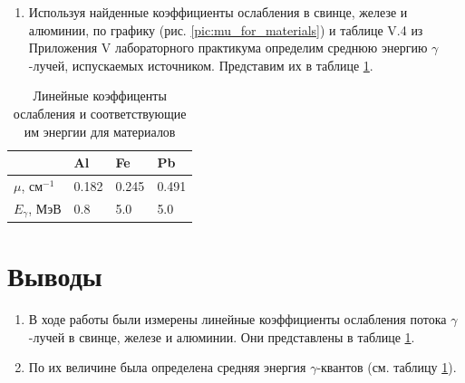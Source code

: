 \documentclass[a4paper,12pt]{article}
\begin{document}
\begin{enumerate}[resume]
    \item Используя найденные коэффициенты ослабления в свинце, железе и алюминии, по графику (рис. \ref{pic:mu_for_materials}) и таблице V.4 из Приложения V лабораторного практикума определим среднюю энергию $\gamma$-лучей, испускаемых источником. Представим их в таблице \ref{table:8}.
\end{enumerate}


\FloatBarrier
\begin{table}[!ht]
    \centering
    \begin{tabular}{|l|l|l|l|}
        \hline
        ~ & Al & Fe & Pb \\ \hline
        $\mu$, $\text{см}^{-1}$ & 0.182 & 0.245 & 0.491 \\ \hline
        $E_\gamma$, МэВ & 0.8 & 5.0 & 5.0 \\ \hline
    \end{tabular}
    \caption{Линейные коэффиценты ослабления и соответствующие им энергии для материалов}
    \label{table:8}
\end{table}
\FloatBarrier

\section{Выводы}

\begin{enumerate}
    \item В ходе работы были измерены линейные коэффициенты ослабления потока $\gamma$-лучей в свинце, железе и алюминии. Они представлены в таблице \ref{table:8}.
    \item По их величине была определена средняя энергия $\gamma$-квантов (см. таблицу \ref{table:8}).
\end{enumerate}
\end{document}
